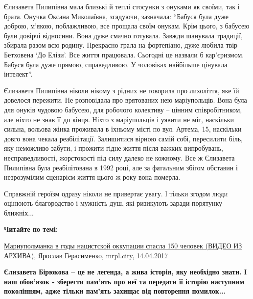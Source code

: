 
Єлизавета Пилипівна мала близькі й теплі стосунки з онуками як своїми, так і
брата. Онучка Оксана Миколаївна, згадуючи, зазначала: \enquote{Бабуся була дуже доброю,
м'якою, поблажливою, все прощала своїм онукам. Крім цього, з бабусею були
довірчі відносини. Вона дуже смачно готувала. Завжди шанувала традиції, збирала
разом всю родину. Прекрасно грала на фортепіано, дуже любила твір Бетховена \enquote{До
Елізи}. Все життя працювала. Сьогодні це назвали б кар'єризмом. Бабуся була
дуже прямою, справедливою. У чоловіках найбільше цінувала інтелект}.


Єлизавета Пилипівна ніколи нікому з рідних не говорила про лихоліття, яке їй
довелося пережити. Не розповідала про врятованих нею маріупольців. Вона була
для онуків чудовою бабусею, для робочого колективу – цінним співробітником, але
ніхто не знав її до кінця. Ніхто з маріупольців і уявити не міг, наскільки
сильна, вольова жінка проживала в їхньому місті по вул. Артема, 15, наскільки
довго вона чекала реабілітації. Залишитися вірною самій собі, пересилити біль,
яку неможливо забути, і прожити гідне життя після важких випробувань,
несправедливості, жорстокості під силу далеко не кожному. Все ж Єлизавета
Пилипівна була реабілітована в 1992 році, але за фатальним збігом обставин і
незрозумілим сценарієм життя цього ж року вона померла.


Справжній героїзм одразу ніколи не привертає увагу. І тільки згодом люди
оцінюють благородство і мужність душ, які ризикують заради порятунку ближніх...


\textbf{Читайте по темі:} 

\vspace{0.5cm}
\begin{minipage}{0.9\textwidth}
\href{https://mrpl.city/news/view/mariupolchanka-v-gody-natsistskoj-okkupatsii-spasla-150-chelovek-video}{%
Мариупольчанка в годы нацистской оккупации спасла 150 человек (ВИДЕО ИЗ АРХИВА), %
Ярослав Герасименко, mrpl.city, 14.04.2017}
\end{minipage}
\vspace{0.5cm}

\textbf{Єлизавета Бірюкова – це не легенда, а жива історія, яку необхідно знати. І наш
обов'язок - зберегти пам'ять про неї та передати її історію наступним
поколінням, адже тільки пам'ять захищає від повторення помилок...}

